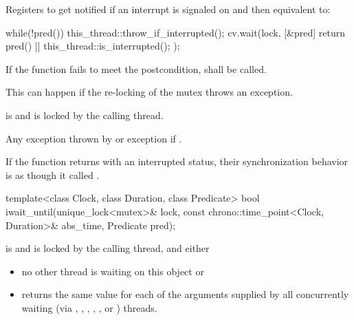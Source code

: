 {\begin{itemdescr}
{\color{diffcolor}
  \pnum\effects Registers  to get notified if an interrupt is signaled on 
                and then equivalent to:
\begin{codeblock}
while(!pred()) {
  this_thread::throw_if_interrupted();
  cv.wait(lock, [&pred] {
                  return pred() || this_thread::is_interrupted();
                });
}
\end{codeblock}
}%
  
 \pnum \remarks
        If the function fails to meet the postcondition, 
        shall be called.
        \begin{note} This can happen if the re-locking of the mutex throws an exception. \end{note}

 \pnum \postconditions {} is  and 
        is locked by the calling thread.

 \pnum \throws Any exception thrown by 
                {\color{diffcolor}or exception  if
                 }.

{\color{diffcolor}
 \pnum\sync If the function returns with an interrupted status, 
                their synchronization behavior is as though it called .
}%
\end{itemdescr}



%
\begin{itemdecl}
template<class Clock, class Duration, class Predicate>
  bool iwait_until(unique_lock<mutex>& lock,
                   const chrono::time_point<Clock, Duration>& abs_time,
                   Predicate pred);
\end{itemdecl}
\begin{itemdescr}
 \pnum \requires {} is  and  is
                locked by the calling thread, and either

        \begin{itemize}
        \item no other thread is waiting on this  object or
        \item {} returns the same value for each of the 
                arguments supplied by all concurrently waiting (via ,
                , 
                {\color{insertcolor}, , , or }) threads.
        \end{itemize}


\end{itemdescr}}
